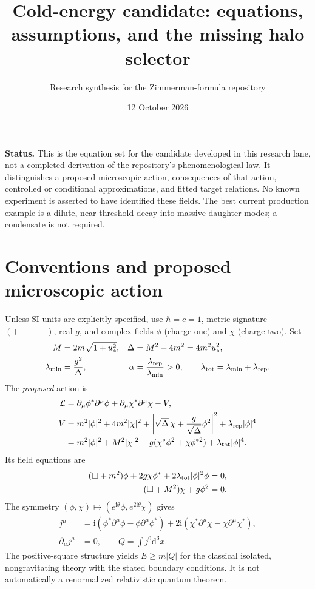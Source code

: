\documentclass[11pt]{article}
\title{Cold-energy candidate: equations, assumptions, and the missing halo selector}
\author{Research synthesis for the Zimmerman-formula repository}
\date{12 October 2026}
\newcommand{\dd}{\mathrm{d}}
\newcommand{\ii}{\mathrm{i}}
\begin{document}
\maketitle
\noindent\textbf{Status.} This is the equation set for the candidate developed in this research lane, not a completed derivation of the repository's phenomenological law. It distinguishes a proposed microscopic action, consequences of that action, controlled or conditional approximations, and fitted target relations. No known experiment is asserted to have identified these fields. The best current production example is a dilute, near-threshold decay into massive daughter modes; a condensate is not required.

\section{Conventions and proposed microscopic action}
Unless SI units are explicitly specified, use $\hbar=c=1$, metric signature $(+---)$, real $g$, and complex fields $\phi$ (charge one) and $\chi$ (charge two). Set
\begin{align}
 M&=2m\sqrt{1+u_*^2},& \Delta&=M^2-4m^2=4m^2u_*^2,\\
 \lambda_{\min}&=\frac{g^2}{\Delta},&\alpha&=\frac{\lambda_{\rm rep}}{\lambda_{\min}}>0,\qquad
 \lambda_{\rm tot}=\lambda_{\min}+\lambda_{\rm rep}.
\end{align}
The \emph{proposed} action is
\begin{align}
 \mathcal L&=\partial_\mu\phi^*\partial^\mu\phi+
 \partial_\mu\chi^*\partial^\mu\chi-V,\\
 V&=m^2|\phi|^2+4m^2|\chi|^2+
 \left|\sqrt\Delta\,\chi+\frac{g}{\sqrt\Delta}\phi^2\right|^2+
 \lambda_{\rm rep}|\phi|^4\\
 &=m^2|\phi|^2+M^2|\chi|^2+g(\chi^*\phi^2+\chi\phi^{*2})+
 \lambda_{\rm tot}|\phi|^4.
\end{align}
Its field equations are
\begin{align}
 (\Box+m^2)\phi+2g\chi\phi^*+2\lambda_{\rm tot}|\phi|^2\phi&=0,\\
 (\Box+M^2)\chi+g\phi^2&=0.
\end{align}
The symmetry $(\phi,\chi)\mapsto(e^{\ii\theta}\phi,e^{2\ii\theta}\chi)$ gives
\begin{align}
 j^\mu&=\ii(\phi^*\partial^\mu\phi-\phi\partial^\mu\phi^*)+
 2\ii(\chi^*\partial^\mu\chi-\chi\partial^\mu\chi^*),\\
 \partial_\mu j^\mu&=0,\qquad Q=\int j^0\dd^3x.
\end{align}
The positive-square structure yields $E\ge m|Q|$ for the classical isolated, nongravitating theory with the stated boundary conditions. It is not automatically a renormalized relativistic quantum theorem.
\end{document}
